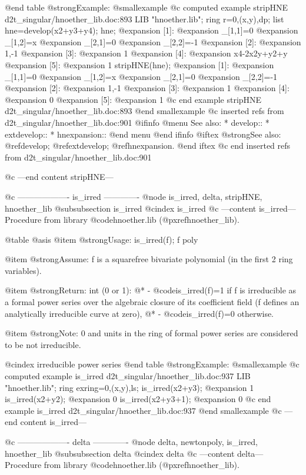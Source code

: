 @end table
@strong{Example:}
@smallexample
@c computed example stripHNE d2t_singular/hnoether_lib.doc:893 
LIB "hnoether.lib";
ring r=0,(x,y),dp;
list hne=develop(x2+y3+y4);
hne;
@expansion{} [1]:
@expansion{}    _[1,1]=0
@expansion{}    _[1,2]=x
@expansion{}    _[2,1]=0
@expansion{}    _[2,2]=-1
@expansion{} [2]:
@expansion{}    1,-1
@expansion{} [3]:
@expansion{}    1
@expansion{} [4]:
@expansion{}    x4-2x2y+y2+y
@expansion{} [5]:
@expansion{}    1
stripHNE(hne);
@expansion{} [1]:
@expansion{}    _[1,1]=0
@expansion{}    _[1,2]=x
@expansion{}    _[2,1]=0
@expansion{}    _[2,2]=-1
@expansion{} [2]:
@expansion{}    1,-1
@expansion{} [3]:
@expansion{}    1
@expansion{} [4]:
@expansion{}    0
@expansion{} [5]:
@expansion{}    1
@c end example stripHNE d2t_singular/hnoether_lib.doc:893
@end smallexample
@c inserted refs from d2t_singular/hnoether_lib.doc:901
@ifinfo
@menu
See also:
* develop::
* extdevelop::
* hnexpansion::
@end menu
@end ifinfo
@iftex
@strong{See also:}
@ref{develop};
@ref{extdevelop};
@ref{hnexpansion}.
@end iftex
@c end inserted refs from d2t_singular/hnoether_lib.doc:901

@c ---end content stripHNE---

@c ------------------- is_irred -------------
@node is_irred, delta, stripHNE, hnoether_lib
@subsubsection is_irred
@cindex is_irred
@c ---content is_irred---
Procedure from library @code{hnoether.lib} (@pxref{hnoether_lib}).

@table @asis
@item @strong{Usage:}
is_irred(f); f poly

@item @strong{Assume:}
f is a squarefree bivariate polynomial (in the first 2 ring
variables).

@item @strong{Return:}
int (0 or 1): @*
- @code{is_irred(f)=1} if f is irreducible as a formal power
series over the algebraic closure of its coefficient field (f
defines an analytically irreducible curve at zero), @*
- @code{is_irred(f)=0} otherwise.

@item @strong{Note:}
0 and units in the ring of formal power series are considered to be
not irreducible.

@cindex irreducible power series
@end table
@strong{Example:}
@smallexample
@c computed example is_irred d2t_singular/hnoether_lib.doc:937 
LIB "hnoether.lib";
ring exring=0,(x,y),ls;
is_irred(x2+y3);
@expansion{} 1
is_irred(x2+y2);
@expansion{} 0
is_irred(x2+y3+1);
@expansion{} 0
@c end example is_irred d2t_singular/hnoether_lib.doc:937
@end smallexample
@c ---end content is_irred---

@c ------------------- delta -------------
@node delta, newtonpoly, is_irred, hnoether_lib
@subsubsection delta
@cindex delta
@c ---content delta---
Procedure from library @code{hnoether.lib} (@pxref{hnoether_lib}).


